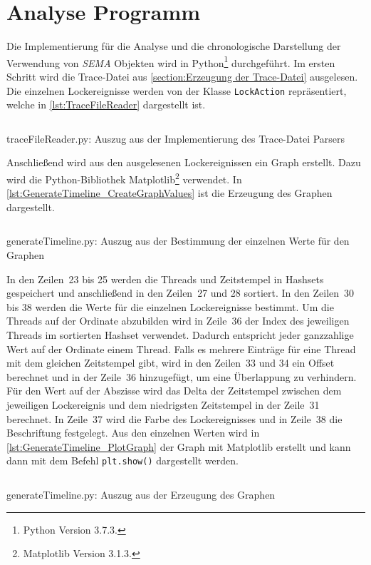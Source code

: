 \section{Analyse Programm}
\label{section:Implementierung:Analyse Programm}
Die Implementierung für die Analyse und die chronologische Darstellung der
Verwendung von \emph{SEMA} Objekten wird in Python\footnote{Python Version
3.7.3.} durchgeführt. Im ersten Schritt wird die Trace-Datei aus
\cref{section:Erzeugung der Trace-Datei} ausgelesen. Die einzelnen
Lockereignisse werden von der Klasse
\texttt{Lock\-Action} repräsentiert, welche in \cref{lst:TraceFileReader}
dargestellt ist.
\begin{listing}[ht]
  \inputminted[frame=lines,linenos,firstline=1,lastline=10]{python}{./Python/traceFileReader.py}
  \caption{traceFileReader.py: Auszug aus der Implementierung des Trace-Datei Parsers}
  \label{lst:TraceFileReader}
\end{listing}

Anschließend wird aus den ausgelesenen Lockereignissen ein Graph erstellt. Dazu
wird die Python-Bibliothek Matplotlib\footnote{Matplotlib Version 3.1.3.}
verwendet. In \cref{lst:GenerateTimeline_CreateGraphValues} ist die Erzeugung
des Graphen dargestellt.
\begin{listing}[ht]
  \inputminted[frame=lines,linenos,firstline=16,lastline=38]{python}{./Python/generateTimeline.py}
  \caption{generateTimeline.py: Auszug aus der Bestimmung der einzelnen Werte für den Graphen}
  \label{lst:GenerateTimeline_CreateGraphValues}
\end{listing}
In den Zeilen~23 bis 25 werden die Threads und Zeitstempel in Hashsets
gespeichert und anschließend in den Zeilen~27 und 28 sortiert. In den Zeilen~30
bis 38 werden die Werte für die einzelnen Lockereignisse bestimmt. Um die
Threads auf der Ordinate abzubilden wird in Zeile~36 der Index des jeweiligen
Threads im sortierten Hashset verwendet. Dadurch entspricht jeder ganzzahlige
Wert auf der Ordinate einem Thread. Falls es mehrere Einträge für eine Thread
mit dem gleichen Zeitstempel gibt, wird in den Zeilen~33 und 34 ein Offset
berechnet und in der Zeile~36 hinzugefügt, um eine Überlappung zu verhindern.
Für den Wert auf der Abszisse wird das Delta der Zeitstempel zwischen dem
jeweiligen Lockereignis und dem niedrigsten Zeitstempel in der Zeile~31
berechnet. In Zeile~37 wird die Farbe des Lockereignisses und in Zeile~38 die
Beschriftung festgelegt. Aus den einzelnen Werten wird in
\cref{lst:GenerateTimeline_PlotGraph} der Graph mit Matplotlib erstellt und kann
dann mit dem Befehl \texttt{plt.show()} dargestellt werden.
\begin{listing}[ht]
  \inputminted[frame=lines,linenos,firstline=42,lastline=44]{python}{./Python/generateTimeline.py}
  \caption{generateTimeline.py: Auszug aus der Erzeugung des Graphen}
  \label{lst:GenerateTimeline_PlotGraph}
\end{listing}


